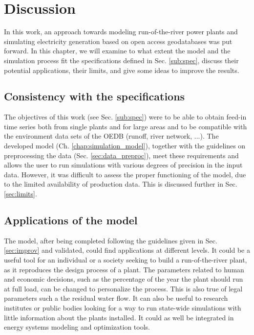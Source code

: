 \chapter{Discussion}
\label{chap:discussion}

In this work, an approach towards modeling run-of-the-river power plants and simulating electricity generation based on open access geodatabases was put forward. In this chapter, we will examine to what extent the model and the simulation process fit the specifications defined in Sec. \ref{sub:spec}, discuss their potential applications, their limits, and give some ideas to improve the results.
\section{Consistency with the specifications}

The objectives of this work (see Sec. \ref{sub:spec}) were to be able to obtain feed-in time series both from single plants and for large areas and to be compatible with the environment data sets of the OEDB (runoff, river network, ...). The developed model (Ch. \ref{chap:simulation_model}), together with the guidelines on preprocessing the data (Sec. \ref{sec:data_preproc}), meet these requirements and allows the user to run simulations with various degrees of precision in the input data. However, it was difficult to assess the proper functioning of the model, due to the limited availability of production data. This is discussed further in Sec. \ref{sec:limits}.

\section{Applications of the model}

The model, after being completed following the guidelines given in Sec. \ref{sec:improv} and validated, could find applications at different levels. It could be a useful tool for an individual or a society seeking to build a run-of-the-river plant, as it reproduces the design process of a plant. The parameters related to human and economic decisions, such as the percentage of the year the plant should run at full load, can be changed to personalize the process. This is also true of legal parameters such a the residual water flow. \newline
It can also be useful to research institutes or public bodies looking for a way to run state-wide simulations with little information about the plants installed. It could as well be integrated in energy systems modeling and optimization tools.

